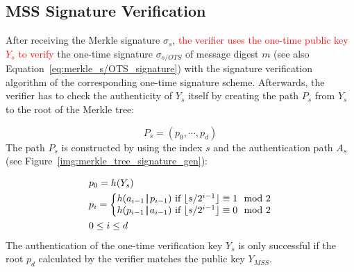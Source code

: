 \subsection{MSS Signature Verification}
After receiving the Merkle signature $\sigma_s$, \textcolor{red}{the verifier uses the one-time public key $Y_s$ to verify} %
 the one-time signature $\sigma_{s/OTS}$ of message digest $m$ (see also Equation~\ref{eq:merkle_s/OTS_signature}) with the signature verification algorithm of the corresponding one-time signature scheme.
Afterwards, the verifier has to check the authenticity of $Y_s$ itself by creating the path $P_s$ from $Y_s$ to the root of the Merkle tree:

\begin{equation}
P_s = (p_0, \cdots, p_d)
\end{equation}
The path $P_s$ is constructed by using the index $s$ and the authentication path $A_s$ (see Figure~\ref{img:merkle_tree_signature_gen}):

\begin{align}
\label{eq:merkle_verifier_path_calculation}
&p_0 = h(Y_s) \\
&p_{i} = 
\left\{\begin{matrix} \nonumber
h(a_{i-1} \operatorname{|\!\!|} p_{i-1}) \text{ if } \lfloor s/2^{i-1}\rfloor \equiv 1 \mod{2} \\
h(p_{i-1} \operatorname{|\!\!|} a_{i-1}) \text{ if } \lfloor s/2^{i-1}\rfloor \equiv 0 \mod{2}
\end{matrix}\right.  \nonumber \\
&0 \leq i \leq d  \nonumber 
\end{align}
The authentication of the one-time verification key $Y_s$ is only successful if the root $p_d$ calculated by the verifier matches the public key $Y_{MSS}$.



